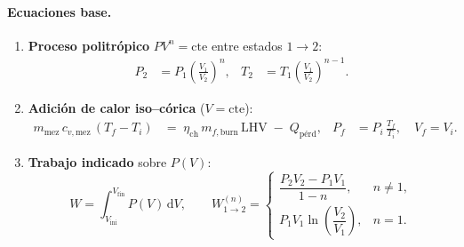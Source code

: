 \documentclass{LS}
\begin{document}
 

\paragraph{Ecuaciones base.}
\begin{enumerate}[label=\alph*)]
  \item \textbf{Proceso politrópico} $PV^{n}=\mathrm{cte}$ entre estados $1\to 2$:
  \vspace{-6pt}
  \begin{align}
    P_2 &= P_1\!\left(\frac{V_1}{V_2}\right)^{n}, &
    T_2 &= T_1\!\left(\frac{V_1}{V_2}\right)^{n-1}.
    \label{eq:poly-base}
  \end{align}

\item \textbf{Adición de calor iso–córica} ($V=\mathrm{cte}$):
\vspace{-6pt}
\begin{align}
m_{\text{mez}}\,c_{v,\text{mez}}\,(T_f - T_i)
&=\; \eta_{\mathrm{ch}}\,m_{f,\mathrm{burn}}\,\mathrm{LHV} \;-\; Q_{\mathrm{pérd}}, &
P_f &= P_i\,\frac{T_f}{T_i}, \quad V_f = V_i.
\label{eq:isoV-base}
\end{align}


  \item \textbf{Trabajo indicado} sobre $P(V)$:
  \vspace{-6pt}
  \begin{equation}
    W=\int_{V_\mathrm{ini}}^{V_\mathrm{fin}} P(V)\,\mathrm{d}V, 
    \qquad
    W^{(n)}_{1\to 2}=
    \begin{cases}
      \dfrac{P_2V_2-P_1V_1}{\,1-n\,}, & n\neq 1,\\[6pt]
      P_1V_1\ln\!\left(\dfrac{V_2}{V_1}\right), & n=1.
    \end{cases}
    \label{eq:work-base}
  \end{equation}
\end{enumerate}
\end{document}
